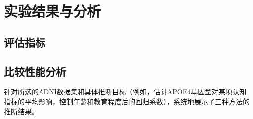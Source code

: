 \documentclass[12pt,a4paper]{article}
\begin{document}
\section{实验结果与分析}




\subsection{评估指标}

\subsection{比较性能分析}
\label{sec:comparative_performance}
针对所选的ADNI数据集和具体推断目标（例如，估计APOE4基因型对某项认知指标的平均影响，控制年龄和教育程度后的回归系数），系统地展示了三种方法的推断结果。
\end{document}
